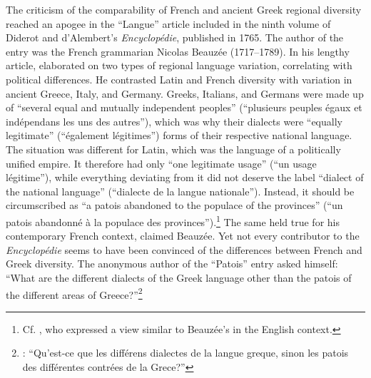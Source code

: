 The criticism of the comparability of French and ancient Greek regional diversity reached an apogee in the “Langue” article included in the ninth volume of Diderot and d’Alembert’s \textit{Encyclopédie}, published in 1765. The author of the entry was the French grammarian Nicolas Beauzée (1717–1789). In his lengthy article, \citet[249]{Beauzee1765} elaborated on two types of regional language variation, correlating with political differences. He contrasted Latin and French diversity with variation in ancient Greece, Italy, and Germany. Greeks, Italians, and Germans were made up of “several equal and mutually independent peoples” (“plusieurs peuples égaux et indépendans les uns des autres”), which was why their dialects were “equally legitimate” (“également légitimes”) forms of their respective national language. The situation was different for Latin, which was the language of a politically unified empire. It therefore had only “one legitimate usage” (“un usage légitime”), while everything deviating from it did not deserve the label “dialect of the national language” (“dialecte de la langue nationale”). Instead, it should be circumscribed as “a patois abandoned to the populace of the provinces” (“un patois abandonné à la populace des provinces”).\footnote{Cf. \citet[135--136]{Priestley1762}, who expressed a view similar to Beauzée’s in the English context.} The same held true for his contemporary French context, claimed Beauzée. Yet not every contributor to the \textit{Encyclopédie} seems to have been convinced of the differences between French and Greek diversity. The anonymous author of the “Patois” entry asked himself: “What are the different dialects of the Greek language other than the patois of the different areas of Greece?”\footnote{\citet[174]{Anon.1765}: “Qu’est-ce que les différens dialectes de la langue greque, sinon les patois des différentes contrées de la Grece?”}

